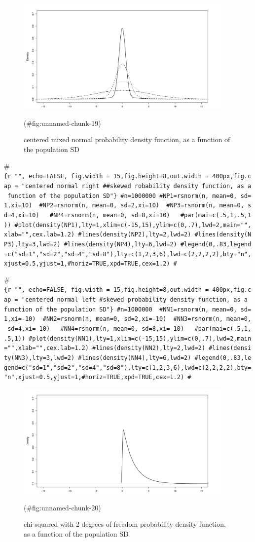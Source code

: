 \begin{appendix}
\begin{figure}
\includegraphics[width=400px]{W-test_files/figure-latex/unnamed-chunk-19-1} \caption{centered mixed normal probability density function, as a function of the population SD}(\#fig:unnamed-chunk-19)
\end{figure}

\#\texttt{\{r\ "",\ echo=FALSE,\ fig.width\ =\ 15,fig.height=8,out.width\ =\ \textquotesingle{}400px\textquotesingle{},fig.cap\ =\ "centered\ normal\ right\ \#\#skewed\ robability\ density\ function,\ as\ a\ function\ of\ the\ population\ SD"\}\ \#n=1000000\ \#NP1=rsnorm(n,\ mean=0,\ sd=1,xi=10)\ \ \#NP2=rsnorm(n,\ mean=0,\ sd=2,xi=10)\ \ \#NP3=rsnorm(n,\ mean=0,\ sd=4,xi=10)\ \ \ \#NP4=rsnorm(n,\ mean=0,\ sd=8,xi=10)\ \ \ \#par(mai=c(.5,1,.5,1))\ \#plot(density(NP1),lty=1,xlim=c(-15,15),ylim=c(0,.7),lwd=2,main="",xlab="",cex.lab=1.2)\ \#lines(density(NP2),lty=2,lwd=2)\ \#lines(density(NP3),lty=3,lwd=2)\ \#lines(density(NP4),lty=6,lwd=2)\ \#legend(0,.83,legend=c("sd=1","sd=2","sd=4","sd=8"),lty=c(1,2,3,6),lwd=c(2,2,2,2),bty="n",xjust=0.5,yjust=1,\#horiz=TRUE,xpd=TRUE,cex=1.2)\ \#}

\#\texttt{\{r\ "",\ echo=FALSE,\ fig.width\ =\ 15,fig.height=8,out.width\ =\ \textquotesingle{}400px\textquotesingle{},fig.cap\ =\ "centered\ normal\ left\ \#skewed\ probability\ density\ function,\ as\ a\ function\ of\ the\ population\ SD"\}\ \#n=1000000\ \ \#NN1=rsnorm(n,\ mean=0,\ sd=1,xi=-10)\ \ \#NN2=rsnorm(n,\ mean=0,\ sd=2,xi=-10)\ \ \#NN3=rsnorm(n,\ mean=0,\ sd=4,xi=-10)\ \ \ \#NN4=rsnorm(n,\ mean=0,\ sd=8,xi=-10)\ \ \ \#par(mai=c(.5,1,.5,1))\ \#plot(density(NN1),lty=1,xlim=c(-15,15),ylim=c(0,.7),lwd=2,main="",xlab="",cex.lab=1.2)\ \#lines(density(NN2),lty=2,lwd=2)\ \#lines(density(NN3),lty=3,lwd=2)\ \#lines(density(NN4),lty=6,lwd=2)\ \#legend(0,.83,legend=c("sd=1","sd=2","sd=4","sd=8"),lty=c(1,2,3,6),lwd=c(2,2,2,2),bty="n",xjust=0.5,yjust=1,\#horiz=TRUE,xpd=TRUE,cex=1.2)\ \#}

\begin{figure}
\includegraphics[width=400px]{W-test_files/figure-latex/unnamed-chunk-20-1} \caption{chi-squared with 2 degrees of freedom probability density function, as a function of the population SD}(\#fig:unnamed-chunk-20)
\end{figure}
\end{appendix}

